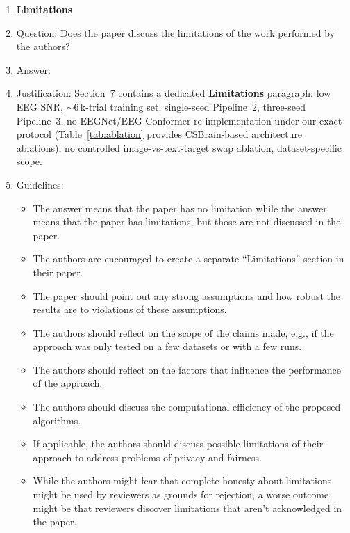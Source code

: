 \documentclass{article}
\begin{document}
\begin{enumerate}
\item {\bf Limitations}
    \item[] Question: Does the paper discuss the limitations of the work performed by the authors?
    \item[] Answer: \answerYes{}
    \item[] Justification: Section~7 contains a dedicated \textbf{Limitations} paragraph: low EEG SNR, $\sim$6\,k-trial training set, single-seed Pipeline~2, three-seed Pipeline~3, no EEGNet/EEG-Conformer re-implementation under our exact protocol (Table~\ref{tab:ablation} provides CSBrain-based architecture ablations), no controlled image-vs-text-target swap ablation, dataset-specific scope.
    \item[] Guidelines:
    \begin{itemize}
        \item The answer \answerNA{} means that the paper has no limitation while the answer \answerNo{} means that the paper has limitations, but those are not discussed in the paper.
        \item The authors are encouraged to create a separate ``Limitations'' section in their paper.
        \item The paper should point out any strong assumptions and how robust the results are to violations of these assumptions.
        \item The authors should reflect on the scope of the claims made, e.g., if the approach was only tested on a few datasets or with a few runs.
        \item The authors should reflect on the factors that influence the performance of the approach.
        \item The authors should discuss the computational efficiency of the proposed algorithms.
        \item If applicable, the authors should discuss possible limitations of their approach to address problems of privacy and fairness.
        \item While the authors might fear that complete honesty about limitations might be used by reviewers as grounds for rejection, a worse outcome might be that reviewers discover limitations that aren't acknowledged in the paper.
    \end{itemize}


\end{enumerate}
\end{document}
